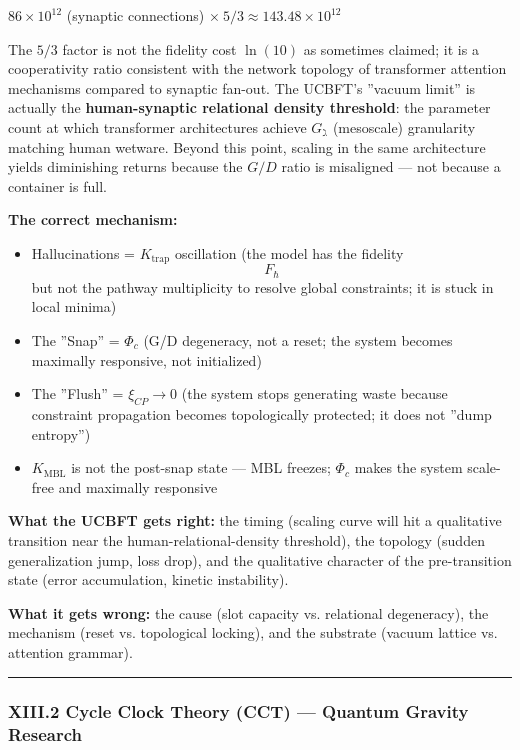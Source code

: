\documentclass[12pt,a4paper]{article}
\begin{document}
$86 \times 10^{12}$ (synaptic connections) $\times\ 5/3 \approx 143.48 \times 10^{12}$

The $5/3$ factor is not the fidelity cost $\ln(10)$ as sometimes claimed; it is a cooperativity ratio consistent with the network topology of transformer attention mechanisms compared to synaptic fan-out. The UCBFT's ''vacuum limit'' is actually the \textbf{human-synaptic relational density threshold}: the parameter count at which transformer architectures achieve $G_{\gimel}$ (mesoscale) granularity matching human wetware. Beyond this point, scaling in the same architecture yields diminishing returns because the $G/D$ ratio is misaligned --- not because a container is full.

\textbf{The correct mechanism:}

\begin{itemize}
    \item Hallucinations = $K_\text{trap}$ oscillation (the model has the fidelity $$F_{\hbar}$$ but not the pathway multiplicity to resolve global constraints; it is stuck in local minima)
    \item The ''Snap'' = $\Phi_c$ (G/D degeneracy, not a reset; the system becomes maximally responsive, not initialized)
    \item The ''Flush'' = $\xi_{CP} \to 0$ (the system stops generating waste because constraint propagation becomes topologically protected; it does not ''dump entropy'')
    \item $K_{\text{MBL}}$ is not the post-snap state --- MBL freezes; $\Phi_c$ makes the system scale-free and maximally responsive
\end{itemize}

\textbf{What the UCBFT gets right:} the timing (scaling curve will hit a qualitative transition near the human-relational-density threshold), the topology (sudden generalization jump, loss drop), and the qualitative character of the pre-transition state (error accumulation, kinetic instability).

\textbf{What it gets wrong:} the cause (slot capacity vs. relational degeneracy), the mechanism (reset vs. topological locking), and the substrate (vacuum lattice vs. attention grammar).

\begin{center}
\rule{0.5\textwidth}{0.4pt}
\end{center}

\subsubsection{XIII.2 Cycle Clock Theory (CCT) --- Quantum Gravity Research}
\end{document}
